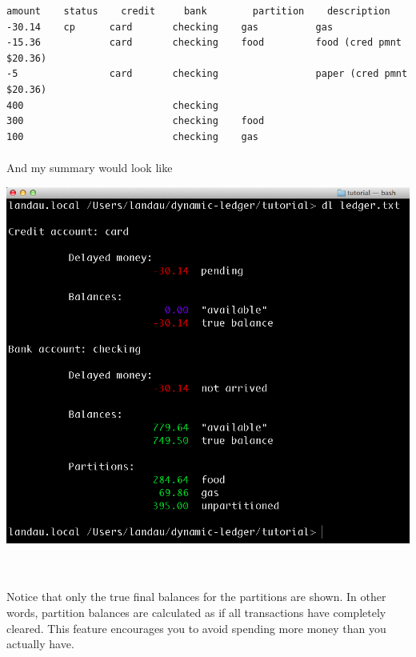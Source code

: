 \documentclass{article}
\providecommand{\q}{$\quad$ \newline}
\begin{document}
\begin{flushleft}
\begin{lstlisting}[title=ledger.txt]
amount    status	credit     bank        partition    description
-30.14    cp      card       checking    gas          gas
-15.36            card       checking    food         food (cred pmnt $20.36)
-5                card       checking                 paper (cred pmnt $20.36)
400                          checking    
300                          checking    food
100                          checking    gas
\end{lstlisting}

\paragraph{} And my summary would look like 

\begin{center}
\includegraphics[scale=.45]{fig/sum8.png}
\end{center} \q

\paragraph{} Notice that only the true final balances for the partitions are shown. In other words, partition balances are calculated as if all transactions have completely cleared. This feature encourages you to avoid spending more money than you actually have.

\end{flushleft}
% 
%
\end{document}
